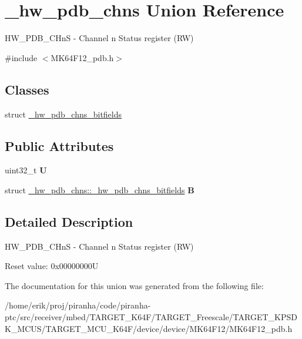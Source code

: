 \hypertarget{union__hw__pdb__chns}{}\section{\+\_\+hw\+\_\+pdb\+\_\+chns Union Reference}
\label{union__hw__pdb__chns}


H\+W\+\_\+\+P\+D\+B\+\_\+\+C\+HnS -\/ Channel n Status register (RW)  




{\ttfamily \#include $<$M\+K64\+F12\+\_\+pdb.\+h$>$}

\subsection*{Classes}
\begin{DoxyCompactItemize}
\item 
struct \hyperlink{struct__hw__pdb__chns_1_1__hw__pdb__chns__bitfields}{\+\_\+hw\+\_\+pdb\+\_\+chns\+\_\+bitfields}
\end{DoxyCompactItemize}
\subsection*{Public Attributes}
\begin{DoxyCompactItemize}
\item 
uint32\+\_\+t {\bfseries U}\hypertarget{union__hw__pdb__chns_a7c59f3c485ed791aeca5c8e72bda84ef}{}\label{union__hw__pdb__chns_a7c59f3c485ed791aeca5c8e72bda84ef}

\item 
struct \hyperlink{struct__hw__pdb__chns_1_1__hw__pdb__chns__bitfields}{\+\_\+hw\+\_\+pdb\+\_\+chns\+::\+\_\+hw\+\_\+pdb\+\_\+chns\+\_\+bitfields} {\bfseries B}\hypertarget{union__hw__pdb__chns_ac96bfeaaf0c4d9e60c274f4f81733ee6}{}\label{union__hw__pdb__chns_ac96bfeaaf0c4d9e60c274f4f81733ee6}

\end{DoxyCompactItemize}


\subsection{Detailed Description}
H\+W\+\_\+\+P\+D\+B\+\_\+\+C\+HnS -\/ Channel n Status register (RW) 

Reset value\+: 0x00000000U 

The documentation for this union was generated from the following file\+:\begin{DoxyCompactItemize}
\item 
/home/erik/proj/piranha/code/piranha-\/ptc/src/receiver/mbed/\+T\+A\+R\+G\+E\+T\+\_\+\+K64\+F/\+T\+A\+R\+G\+E\+T\+\_\+\+Freescale/\+T\+A\+R\+G\+E\+T\+\_\+\+K\+P\+S\+D\+K\+\_\+\+M\+C\+U\+S/\+T\+A\+R\+G\+E\+T\+\_\+\+M\+C\+U\+\_\+\+K64\+F/device/device/\+M\+K64\+F12/M\+K64\+F12\+\_\+pdb.\+h\end{DoxyCompactItemize}
